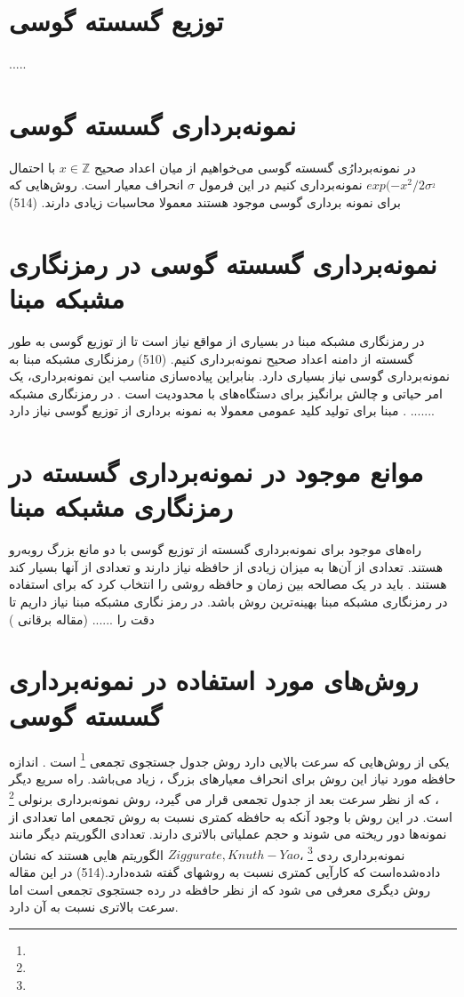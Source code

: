 
\section{توزیع گسسته گوسی }
.....

\section{نمونه‌برداری گسسته گوسی  }

در نمونه‌بردارُی گسسته گوسی می‌خواهیم از میان اعداد صحیح  $x \in \mathbb{Z}$ با احتمال$exp(-x^{2}/2\sigma^_{2}$ نمونه‌برداری کنیم در این فرمول  $\sigma$ انحراف معیار است. روش‌هایی که برای نمونه برداری گوسی موجود هستند معمولا محاسبات زیادی دارند. (514)


\section{نمونه‌برداری گسسته گوسی در رمزنگاری مشبکه مبنا  }
در رمزنگاری مشبکه مبنا در بسیاری از مواقع نیاز است تا از توزیع  گوسی به طور گسسته از دامنه اعداد صحیح نمونه‌برداری کنیم. (510)
 رمزنگاری مشبکه مبنا به نمونه‌برداری گوسی نیاز بسیاری دارد. بنابراین پیاده‌سازی مناسب این نمونه‌برداری، یک امر حیاتی و چالش برانگیز برای دستگاه‌های با محدودیت است . در رمزنگاری مشبکه مبنا برای تولید کلید عمومی معمولا به نمونه برداری از توزیع گوسی نیاز دارد . .......


\section{موانع موجود در نمونه‌برداری گسسته  در رمزنگاری مشبکه مبنا }
راه‌های موجود برای نمونه‌برداری گسسته از توزیع گوسی با دو مانع بزرگ روبه‌رو هستند. تعدادی از آن‌ها به میزان زیادی از حافظه نیاز دارند و تعدادی از آنها بسیار کند هستند . باید در یک مصالحه بین زمان و حافظه روشی را انتخاب کرد که برای استفاده در رمزنگاری مشبکه مبنا بهینه‌ترین روش باشد. 
در رمز نگاری مشبکه مبنا نیاز داریم تا دقت را ...... (مقاله برقانی )

\section{روش‌های مورد استفاده در نمونه‌برداری گسسته گوسی}
یکی از روش‌هایی که سرعت بالایی دارد روش جدول جستجوی تجمعی 
\footnote{}
 است . اندازه حافظه مورد نیاز این روش برای انحراف معیارهای بزرگ ، زیاد می‌باشد. راه سریع دیگر ، که از نظر سرعت بعد از جدول تجمعی قرار می گیرد، روش نمونه‌برداری برنولی 
\footnote{}
است. در این روش با وجود آنکه به حافظه کمتری نسبت به روش تجمعی اما تعدادی از نمونه‌ها دور ریخته می شوند و حجم عملیاتی بالاتری دارند.
تعدادی الگوریتم دیگر مانند نمونه‌برداری ردی
\footnote{}
،$Ziggurate, Knuth-Yao$
الگوریتم هایی هستند که نشان داده‌شده‌است که کارآیی کمتری نسبت به روشهای گفته شده‌دارد.(514)
در این مقاله روش دیگری معرفی می شود که از نظر حافظه در رده جستجوی تجمعی است اما سرعت بالاتری نسبت به آن دارد. 







